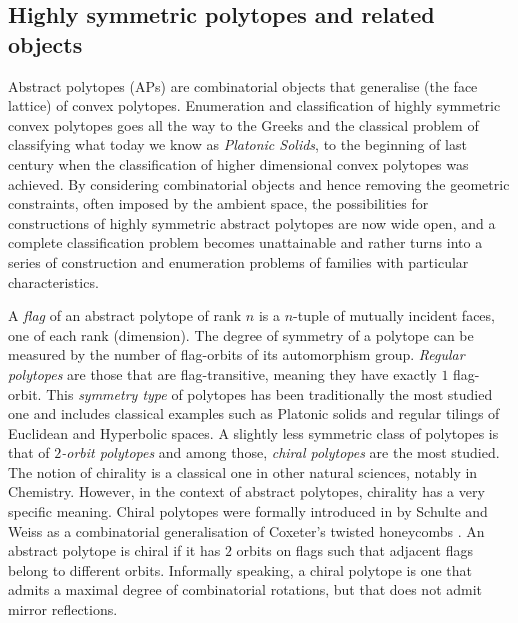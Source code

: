 \subsection*{Highly symmetric polytopes and related objects}

Abstract polytopes (APs) are combinatorial objects that generalise (the face lattice) of convex polytopes.
Enumeration and classification of highly symmetric convex polytopes goes all the way to the Greeks and the classical problem of classifying what today we know as \emph{Platonic Solids}, to the beginning of last century when the classification of higher dimensional convex polytopes was achieved.
By considering combinatorial objects and hence removing the geometric constraints, often imposed by the ambient space, the possibilities for constructions of highly symmetric abstract polytopes are now wide open, and a complete classification problem becomes unattainable and rather turns into a series of construction and enumeration problems of families with particular characteristics.

A \emph{flag} of an abstract polytope of rank $n$ is a $n$-tuple of mutually incident faces, one of each rank (dimension). 
The degree of symmetry of a polytope can be measured by the number of flag-orbits of its automorphism group.
%
\emph{Regular polytopes} are those that are flag-transitive, meaning they have exactly $1$ flag-orbit.
This \emph{symmetry type} of polytopes has been traditionally the most studied one and includes classical examples such as Platonic solids and regular tilings of Euclidean and Hyperbolic spaces.
A slightly less symmetric class of polytopes is that of \emph{$2$-orbit polytopes} and among those, \emph{chiral polytopes} are the most studied.
The notion of chirality is a classical one in other natural sciences, notably in Chemistry.
However, in the context of abstract polytopes, chirality has a very specific meaning. 
Chiral polytopes were formally introduced in \cite*{SchulWeiss1991_ChiralPolytopes} by Schulte and Weiss as a combinatorial generalisation of Coxeter's twisted honeycombs \cite*{Coxeter1970_TwistedHoneycombs}.
An abstract polytope is chiral if it has $2$ orbits on flags such that adjacent flags belong to different orbits. 
Informally speaking, a chiral polytope is one that admits a maximal degree of combinatorial rotations, but that does not admit mirror reflections.

